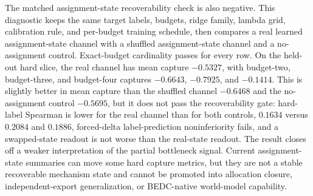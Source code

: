 The matched assignment-state recoverability check is also negative.  This
diagnostic keeps the same target labels, budgets, ridge family, lambda grid,
calibration rule, and per-budget training schedule, then compares a real
learned assignment-state channel with a shuffled assignment-state channel and a
no-assignment control.  Exact-budget cardinality passes for every row.  On the
held-out hard slice, the real channel has mean capture $-0.5327$, with
budget-two, budget-three, and budget-four captures $-0.6643$, $-0.7925$, and
$-0.1414$.  This is slightly better in mean capture than the shuffled channel
$-0.6468$ and the no-assignment control $-0.5695$, but it does not pass the
recoverability gate: hard-label Spearman is lower for the real channel than
for both controls, $0.1634$ versus $0.2084$ and $0.1886$, forced-delta
label-prediction noninferiority fails, and a swapped-state readout is not worse
than the real-state readout.  The result closes off a weaker interpretation of
the partial bottleneck signal.  Current assignment-state summaries can move
some hard capture metrics, but they are not a stable recoverable mechanism
state and cannot be promoted into allocation closure, independent-export
generalization, or BEDC-native world-model capability.
